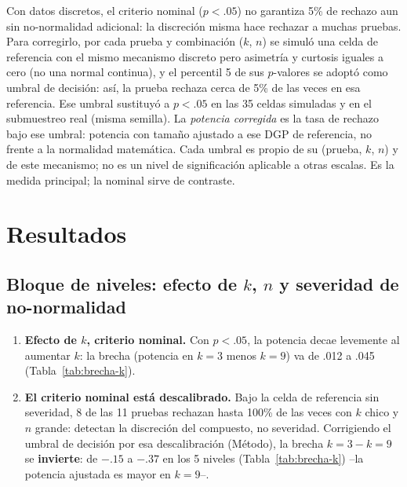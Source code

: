 \documentclass[man,mask,donotrepeattitle,floatsintext]{apa7}
\begin{document}
Con datos discretos, el criterio nominal ($p<.05$) no garantiza 5\% de rechazo aun sin no-normalidad adicional: la discreción misma hace rechazar a muchas pruebas. Para corregirlo, por cada prueba y combinación ($k$, $n$) se simuló una celda de referencia con el mismo mecanismo discreto pero asimetría y curtosis iguales a cero (no una normal continua), y el percentil 5 de sus $p$-valores se adoptó como umbral de decisión: así, la prueba rechaza cerca de 5\% de las veces en esa referencia. Ese umbral sustituyó a $p<.05$ en las 35 celdas simuladas y en el submuestreo real (misma semilla). La \emph{potencia corregida} es la tasa de rechazo bajo ese umbral: potencia con tamaño ajustado a ese DGP de referencia, no frente a la normalidad matemática. Cada umbral es propio de su (prueba, $k$, $n$) y de este mecanismo; no es un nivel de significación aplicable a otras escalas. Es la medida principal; la nominal sirve de contraste.

\section{Resultados}
\label{sec:results}

\subsection{Bloque de niveles: efecto de \texorpdfstring{$k$}{k}, \texorpdfstring{$n$}{n} y severidad de no-normalidad}
\label{sec:res-niveles}

\begin{enumerate}
\item \textbf{Efecto de $k$, criterio nominal.} Con $p<.05$, la potencia decae levemente al aumentar $k$: la brecha (potencia en $k=3$ menos $k=9$) va de .012 a .045 (Tabla~\ref{tab:brecha-k}).
\item \textbf{El criterio nominal está descalibrado.} Bajo la celda de referencia sin severidad, 8 de las 11 pruebas rechazan hasta 100\% de las veces con $k$ chico y $n$ grande: detectan la discreción del compuesto, no severidad. Corrigiendo el umbral de decisión por esa descalibración (Método), la brecha $k=3-k=9$ se \textbf{invierte}: de $-.15$ a $-.37$ en los 5 niveles (Tabla~\ref{tab:brecha-k}) --la potencia ajustada es mayor en $k=9$--.
\end{enumerate}
\end{document}
